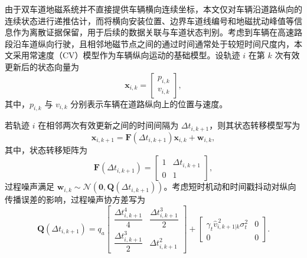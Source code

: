 \documentclass{xdupgthesis}
\begin{document}
由于双车道地磁系统并不直接提供车辆横向连续坐标，本文仅对车辆沿道路纵向的连续状态进行递推估计，而将横向安装位置、边界车道线编号和地磁扰动峰值等信息作为离散证据保留，用于后续的数据关联与车道状态判别。考虑到车辆在高速路段沿车道纵向行驶，且相邻地磁节点之间的通过时间通常处于较短时间尺度内，本文采用常速度（CV）模型作为车辆纵向运动的基础模型。设轨迹 $i$ 在第 $k$ 次有效更新后的状态向量为
\begin{equation}
	\mathbf x_{i,k}=
	\begin{bmatrix}
		p_{i,k}\\
		v_{i,k}
	\end{bmatrix},
	\label{eq:ch3_state_vec}
\end{equation}
其中，$p_{i,k}$ 与 $v_{i,k}$ 分别表示车辆在道路纵向上的位置与速度。

若轨迹 $i$ 在相邻两次有效更新之间的时间间隔为 $\Delta t_{i,k+1}$，则其状态转移模型写为
\begin{equation}
	\mathbf x_{i,k+1}=
	\mathbf F\left(\Delta t_{i,k+1}\right)\mathbf x_{i,k}+\mathbf w_{i,k},
	\label{eq:ch3_state_transition}
\end{equation}
其中，状态转移矩阵为
\begin{equation}
	\mathbf F\left(\Delta t_{i,k+1}\right)=
	\begin{bmatrix}
		1 & \Delta t_{i,k+1}\\
		0 & 1
	\end{bmatrix},
	\label{eq:ch3_F}
\end{equation}
过程噪声满足 $\mathbf w_{i,k}\sim\mathcal N(\mathbf 0,\mathbf Q(\Delta t_{i,k+1}))$。考虑短时机动和时间戳抖动对纵向传播误差的影响，过程噪声协方差写为
\begin{equation}
	\mathbf Q\left(\Delta t_{i,k+1}\right)
	=
	q_a
	\begin{bmatrix}
		\dfrac{\Delta t_{i,k+1}^{4}}{4} & \dfrac{\Delta t_{i,k+1}^{3}}{2}\\[6pt]
		\dfrac{\Delta t_{i,k+1}^{3}}{2} & \Delta t_{i,k+1}^{2}
	\end{bmatrix}
	+
	\begin{bmatrix}
		\gamma_t \hat v_{i,k+1|k}^{\,2}\sigma_t^2 & 0\\
		0 & 0
	\end{bmatrix}.
	\label{eq:ch3_Q}
\end{equation}
\end{document}
